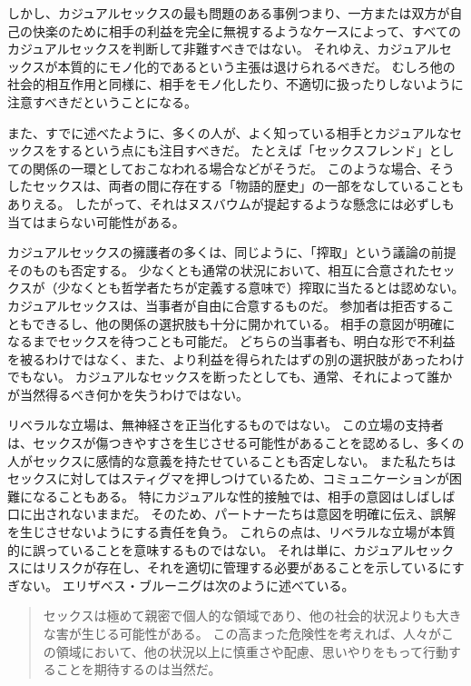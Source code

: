 \documentclass[paper=a4,book,openany]{jlreq} \usepackage{mystyle}
\begin{document}
しかし、カジュアルセックスの最も問題のある事例{\DDASH}つまり、一方または双方が自己の快楽のために相手の利益を完全に無視するようなケース{\DDASH}によって、すべてのカジュアルセックスを判断して非難すべきではない。
それゆえ、カジュアルセックスが本質的にモノ化的であるという主張は退けられるべきだ。
むしろ他の社会的相互作用と同様に、相手をモノ化したり、不適切に扱ったりしないように注意すべきだということになる。

また、すでに述べたように、多くの人が、よく知っている相手とカジュアルなセックスをするという点にも注目すべきだ。
たとえば「セックスフレンド」としての関係の一環としておこなわれる場合などがそうだ。
このような場合、そうしたセックスは、両者の間に存在する「物語的歴史」の一部をなしていることもありえる。
したがって、それはヌスバウムが提起するような懸念には必ずしも当てはまらない可能性がある。

カジュアルセックスの擁護者の多くは、同じように、「搾取」という議論の前提そのものも否定する。
少なくとも通常の状況において、相互に合意されたセックスが（少なくとも哲学者たちが定義する意味で）搾取に当たるとは認めない。
カジュアルセックスは、当事者が自由に合意するものだ。
参加者は拒否することもできるし、他の関係の選択肢も十分に開かれている。
相手の意図が明確になるまでセックスを待つことも可能だ。
どちらの当事者も、明白な形で不利益を被るわけではなく、また、より利益を得られたはずの別の選択肢があったわけでもない。
カジュアルなセックスを断ったとしても、通常、それによって誰かが当然得るべき何かを失うわけではない。

リベラルな立場は、無神経さを正当化するものではない。
この立場の支持者は、セックスが傷つきやすさを生じさせる可能性があることを認めるし、多くの人がセックスに感情的な意義を持たせていることも否定しない。
また私たちはセックスに対してはスティグマを押しつけているため、コミュニケーションが困難になることもある。
特にカジュアルな性的接触では、相手の意図はしばしば口に出されないままだ。
そのため、パートナーたちは意図を明確に伝え、誤解を生じさせないようにする責任を負う。
これらの点は、リベラルな立場が本質的に誤っていることを意味するものではない。
それは単に、カジュアルセックスにはリスクが存在し、それを適切に管理する必要があることを示しているにすぎない。
エリザベス・ブルーニグは次のように述べている。

\begin{quote}
  セックスは極めて親密で個人的な領域であり、他の社会的状況よりも大きな害が生じる可能性がある。
この高まった危険性を考えれば、人々がこの領域において、他の状況以上に慎重さや配慮、思いやりをもって行動することを期待するのは当然だ。
\citep{bruenig18:_aziz_ansar_debac}

\end{quote}
\end{document}
